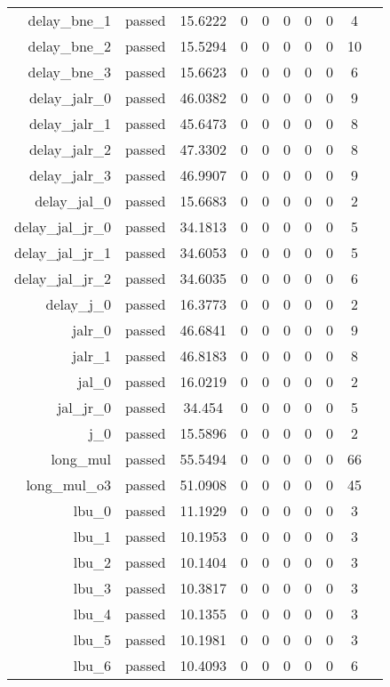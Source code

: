 \begin{longtable}{r|ccccccccc}
    delay\_bne\_1 & passed & 15.6222 & 0 & 0 & 0 & 0 & 0 & 4 \\
    delay\_bne\_2 & passed & 15.5294 & 0 & 0 & 0 & 0 & 0 & 10 \\
    delay\_bne\_3 & passed & 15.6623 & 0 & 0 & 0 & 0 & 0 & 6 \\
    delay\_jalr\_0 & passed & 46.0382 & 0 & 0 & 0 & 0 & 0 & 9 \\
    delay\_jalr\_1 & passed & 45.6473 & 0 & 0 & 0 & 0 & 0 & 8 \\
    delay\_jalr\_2 & passed & 47.3302 & 0 & 0 & 0 & 0 & 0 & 8 \\
    delay\_jalr\_3 & passed & 46.9907 & 0 & 0 & 0 & 0 & 0 & 9 \\
    delay\_jal\_0 & passed & 15.6683 & 0 & 0 & 0 & 0 & 0 & 2 \\
    delay\_jal\_jr\_0 & passed & 34.1813 & 0 & 0 & 0 & 0 & 0 & 5 \\
    delay\_jal\_jr\_1 & passed & 34.6053 & 0 & 0 & 0 & 0 & 0 & 5 \\
    delay\_jal\_jr\_2 & passed & 34.6035 & 0 & 0 & 0 & 0 & 0 & 6 \\
    delay\_j\_0 & passed & 16.3773 & 0 & 0 & 0 & 0 & 0 & 2 \\
    jalr\_0 & passed & 46.6841 & 0 & 0 & 0 & 0 & 0 & 9 \\
    jalr\_1 & passed & 46.8183 & 0 & 0 & 0 & 0 & 0 & 8 \\
    jal\_0 & passed & 16.0219 & 0 & 0 & 0 & 0 & 0 & 2 \\
    jal\_jr\_0 & passed & 34.454 & 0 & 0 & 0 & 0 & 0 & 5 \\
    j\_0 & passed & 15.5896 & 0 & 0 & 0 & 0 & 0 & 2 \\
    long\_mul & passed & 55.5494 & 0 & 0 & 0 & 0 & 0 & 66 \\
    long\_mul\_o3 & passed & 51.0908 & 0 & 0 & 0 & 0 & 0 & 45 \\
    lbu\_0 & passed & 11.1929 & 0 & 0 & 0 & 0 & 0 & 3 \\
    lbu\_1 & passed & 10.1953 & 0 & 0 & 0 & 0 & 0 & 3 \\
    lbu\_2 & passed & 10.1404 & 0 & 0 & 0 & 0 & 0 & 3 \\
    lbu\_3 & passed & 10.3817 & 0 & 0 & 0 & 0 & 0 & 3 \\
    lbu\_4 & passed & 10.1355 & 0 & 0 & 0 & 0 & 0 & 3 \\
    lbu\_5 & passed & 10.1981 & 0 & 0 & 0 & 0 & 0 & 3 \\
    lbu\_6 & passed & 10.4093 & 0 & 0 & 0 & 0 & 0 & 6 \\

\end{longtable}
